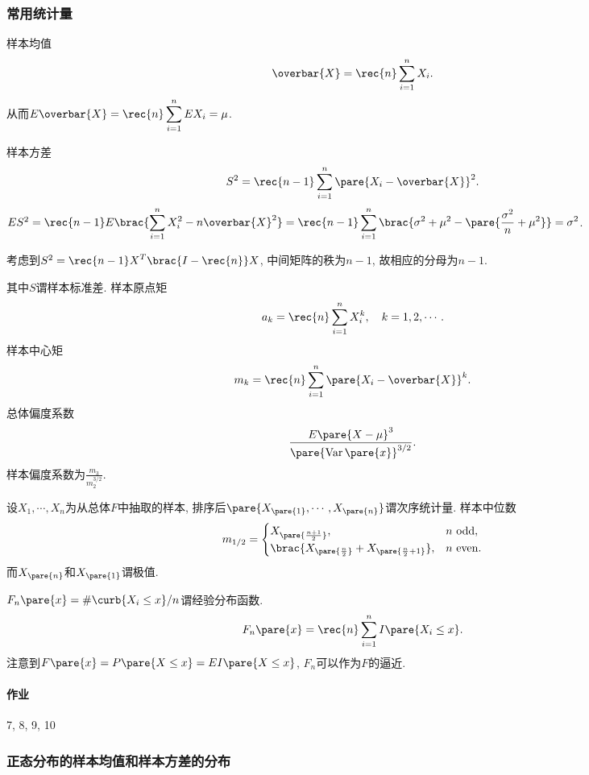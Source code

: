 \documentclass{ctexart}
\DeclareMathOperator{\Var}{Var}
\begin{document}
\subsubsection{常用统计量} %
\label{ssub:常用统计量}

样本均值
\[ \overbar{X} = \rec{n} \sum_{i=1}^n X_i. \]
从而$E\overbar{X} = \displaystyle \rec{n}\sum_{i=1}^n EX_i = \mu$.
\par
样本方差
\[ S^2 = \rec{n-1}\sum_{i=1}^n \pare{X_i - \overbar{X}}^2. \]
$ES^2 = \displaystyle \rec{n-1} E\brac{\sum_{i=1}^n X_i^2 - n\overbar{X}^2} = \rec{n-1} \sum_{i=1}^n \brac{\sigma^2 + \mu^2 - \pare{\frac{\sigma^2}{n} + \mu^2}} = \sigma^2$.
\begin{remark}
    考虑到$S^2 = \displaystyle \rec{n-1} X^T\brac{I - \rec{n}}X$, 中间矩阵的秩为$n-1$, 故相应的分母为$n-1$.
\end{remark}
其中$S$谓样本标准差. 样本原点矩
\[ a_k = \rec{n} \sum_{i=1}^n X_i^k,\quad k=1,2,\cdots. \]
样本中心矩
\[ m_k = \rec{n} \sum_{i=1}^n \pare{X_i - \overbar{X}}^k. \]
总体偏度系数
\[ \frac{E\pare{X-\mu}^3}{\pare{\Var\pare{x}}^{3/2}}. \]
样本偏度系数为$\displaystyle \frac{m_3}{m_2^{3/2}}$.
\par
设$X_1, \cdots, X_n$为从总体$F$中抽取的样本, 排序后$\pare{X_{\pare{1}},\cdots, X_{\pare{n}}}$谓次序统计量. 样本中位数
\[ m_{1/2} = \begin{cases}
    X_{\pare{\frac{n+1}{2}}}, & n \mathrm{\ odd}, \\
    \brac{X_{\pare{\frac{n}{2}}} + X_{\pare{\frac{n}{2}+1}}}, & n \mathrm{\ even}.
\end{cases} \]
而$X_{\pare{n}}$和$X_{\pare{1}}$谓极值.
\par
$F_n\pare{x} = \#\curb{X_i \le x}/n$谓经验分布函数.
\[ F_n\pare{x} = \rec{n}\sum_{i=1}^n I\pare{X_i \le x}. \]
注意到$F\pare{x} = P\pare{X\le x} = EI\pare{X\le x}$, $F_n$可以作为$F$的逼近.

\paragraph{作业} %
\label{par:作业}

7, 8, 9, 10



\subsubsection{正态分布的样本均值和样本方差的分布} %
\label{ssub:正态分布的样本均值和样本方差的分布}
\end{document}
